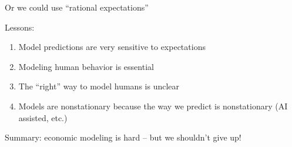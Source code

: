 \documentclass[
    xcolor={svgnames,dvipsnames},
    hyperref={colorlinks, citecolor=DeepPink4, linkcolor=DarkRed, urlcolor=DarkBlue}
    ]{beamer}  %
\newcommand{\1}{\mathbbm 1}
\begin{document}
\begin{frame}

    Or we could use ``rational expectations''
    
    \begin{figure}
        \centering
    \end{figure}

\end{frame}


\begin{frame}

    Lessons:
    \begin{enumerate}
        \item Model predictions are very sensitive to expectations
            \vspace{1em}
        \item Modeling human behavior is essential
            \vspace{1em}
        \item The ``right'' way to model humans is unclear
            \vspace{1em}
        \item Models are nonstationary because the way we predict is
            nonstationary (AI assisted, etc.)
    \end{enumerate}
    
        \vspace{1em}
        \vspace{1em}
    Summary: economic modeling is hard -- but we shouldn't give up!

\end{frame}
\end{document}
